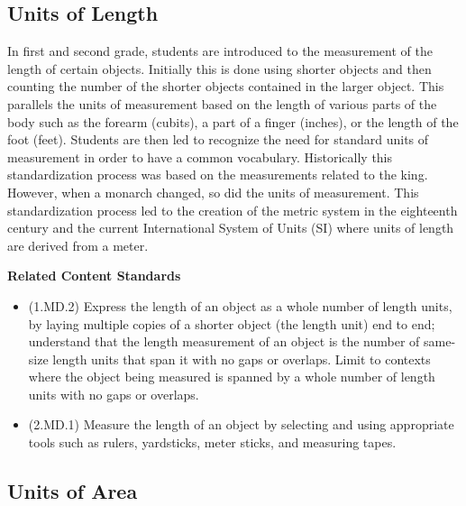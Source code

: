 \documentclass[
]{book}
\providecommand{\tightlist}{%
  \setlength{\itemsep}{0pt}\setlength{\parskip}{0pt}}
\newenvironment{standards}{}{}
\theoremstyle{definition}
\theoremstyle{definition}
\theoremstyle{definition}
\theoremstyle{definition}
\theoremstyle{remark}
\begin{document}
\hypertarget{units-of-length}{%
\subsection{Units of Length}\label{units-of-length}}

In first and second grade, students are introduced to the measurement of the length of certain objects. Initially this is done using shorter objects and then counting the number of the shorter objects contained in the larger object. This parallels the units of measurement based on the length of various parts of the body such as the forearm (cubits), a part of a finger (inches), or the length of the foot (feet). Students are then led to recognize the need for standard units of measurement in order to have a common vocabulary. Historically this standardization process was based on the measurements related to the king. However, when a monarch changed, so did the units of measurement. This standardization process led to the creation of the metric system in the eighteenth century and the current International System of Units (SI) where units of length are derived from a meter.

\begin{standards}

\begin{center}
\textbf{Related Content Standards}

\end{center}

\begin{itemize}
\tightlist
\item
  (1.MD.2) Express the length of an object as a whole number of length units, by laying multiple copies of a shorter object (the length unit) end to end; understand that the length measurement of an object is the number of same-size length units that span it with no gaps or overlaps. Limit to contexts where the object being measured is spanned by a whole number of length units with no gaps or overlaps.
\item
  (2.MD.1) Measure the length of an object by selecting and using appropriate tools such as rulers, yardsticks, meter sticks, and measuring tapes.
\end{itemize}

\end{standards}

\hypertarget{units-of-area}{%
\subsection{Units of Area}\label{units-of-area}}
\end{document}

